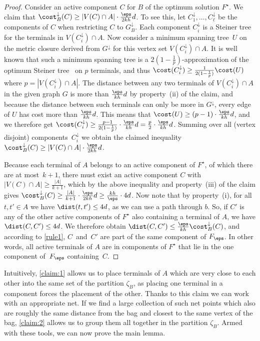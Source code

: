 %
\begin{proof}%
Consider an active component $C$ for $B$ of the optimum solution $F^\star$. We 
claim that $\cost^\downarrow_{B}(C)\ge |V(C)\cap A|\cdot \frac{\eps}{2kh}d$. 
%
%
%
    To see this, let $C^\downarrow_1,\ldots,C^\downarrow_\ell$ be the components of $C$ when restricting $C$ to $G^\downarrow_B$. Each component $C^\downarrow_i$ is a Steiner tree for the terminals in $V(C^\downarrow_i)\cap A$. Now consider a minimum spanning tree~$U$ on the metric closure derived from $G^\downarrow$ for this vertex set $V(C^\downarrow_i)\cap A$. It is well known that such a minimum spanning tree is a $2(1-\frac{1}{p})$-approximation of the optimum Steiner tree~\cite{KouMB81} on $p$ terminals, and thus $\cost(C^\downarrow_i)\geq\frac{1}{2(1-\frac{1}{p})}\cost(U)$ where $p=|V(C^\downarrow_i)\cap A|$. The distance between any two terminals of $V(C^\downarrow_i)\cap A$ in the given graph $G$ is more than $\frac{\eps}{kh}d$ by property~(ii) of the claim, and because the distance between such terminals can only be more in $G^\downarrow$, every edge of $U$ has cost more than $\frac{\eps}{kh}d$. This means that $\cost(U)\geq (p-1)\cdot\frac{\eps}{kh}d$, and we therefore get $\cost(C^\downarrow_i)\ge \frac{p-1}{2(1-\frac{1}{p})}\cdot \frac{\eps}{kh}d =\frac{p}{2}\cdot\frac{\eps}{kh}d$. Summing over all (vertex disjoint) components~$C^\downarrow_i$ we obtain the claimed inequality $\cost^\downarrow_{B}(C)\ge |V(C)\cap A|\cdot \frac{\eps}{2kh}d$.

    Because each terminal of $A$ belongs to an active component of $F^\star$, of which there are at most~$k+1$, there must exist an active component $C$ with $|V(C)\cap A|\geq\frac{|A|}{k+1}$, which by the above inequality and property~(iii) of the claim gives $\cost^\downarrow_{B}(C)\ge \frac{|A|}{k+1}\cdot \frac{\eps}{2kh}d\ge \frac{kh}{\eps}\cdot 4d$.
    Now note that by property~(i), for all $t,t'\in A$ we have $\dist(t,t')\le 4d$, as we can use a path through $b$. So, if $C'$ is any of the other active components of $F^\star$ also containing a terminal of $A$, we have $\dist(C,C')\le 4d$. We therefore obtain $\dist(C,C')\le \frac{\eps}{kh}\cost^\downarrow_{B}(C)$, and according to \autoref{rule1}, $C$~and~$C'$ are part of the same component of $F_\eps$. In other words, all active terminals of $A$ are in components of $F^\star$ that lie in the one component of~$F_\eps$ containing~$C$.
\end{proof}
%

Intuitively, \autoref{claim:1} allows us to place terminals of $A$ which are very close to each other into the same set of the partition $\zeta_B$, as placing one terminal in a component forces the placement of the other. Thanks to this claim we can work with an appropriate net. 
If we find a large collection of such net points which also are roughly the same distance from the bag and closest to the same vertex of the bag, \autoref{claim:2} allows us to group them all together in the partition $\zeta_B$.
Armed with these tools, we can now prove the main lemma.

